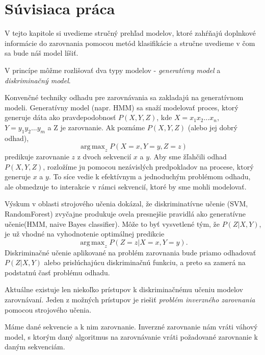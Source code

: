 \chapter{Súvisiaca práca}

V tejto kapitole si uvedieme stručný prehľad modelov, ktoré zahŕňajú doplnkové informácie do zarovnania pomocou metód klasifikácie a stručne uvedieme v čom sa bude náš model líšiť.

V princípe môžme rozlišovať dva typy modelov - \textit{generatívny model} a \textit{diskriminačný model}.

Konvenčné techniky odhadu pre zarovnávania sa zakladajú na generatívnom modeli. Generatívny model (napr. HMM) sa snaží modelovať proces, ktorý generuje dáta ako pravdepodobnosť $P(X,Y,Z)$, kde $X = x_1x_2\dots x_n$, $Y = y_1y_2\dots y_m$ a Z je zarovnanie. Ak poznáme $P(X,Y,Z)$ (alebo jej dobrý odhad),
$$\operatorname{arg\,max}_z P(X = x,Y = y,Z = z)$$
predikuje zarovnanie $z$ z dvoch sekvencií $x$ a $y$. Aby sme žľahčili odhad $P(X,Y,Z)$, rozložíme ju pomocou nezávislých predpokladov na procese, ktorý generuje $x$ a $y$. To síce vedie k efektívnym a jednoduchým problémom odhadu, ale obmedzuje to interakcie v rámci sekvencií, ktoré by sme mohli modelovať. \cite{svmTrainingProteinsAlignment}

Výskum v oblasti strojového učenia dokázal, že diskriminatívne učenie (SVM, RandomForest) zvyčajne produkuje ovela presnejšie pravidlá ako generatívne učenie(HMM, naive Bayes classifier).
Môže to byť vysvetlené tým, že $P(Z|X,Y)$, je už vhodné na vyhodnotenie optimálnej predikcie
$$\operatorname{arg\,max}_z P(Z = z|X = x,Y = y).$$
Diskriminačné učenie aplikované na problém zarovnania bude priamo odhadovať $P(Z|X,Y)$ alebo prislúchajúcu diskriminačnú funkciu, a preto sa zamerá na podstatnú časť problému odhadu. \cite{svmTrainingProteinsAlignment}

Aktuálne existuje len niekoľko prístupov k diskriminačnému učeniu modelov zarovnávaní. 
Jeden z možných prístupov je riešiť \textit{problém inverzného zarovnania} pomocou strojového učenia. \cite{svmTrainingProteinsAlignment}

\begin{df}
Máme dané sekvencie a k nim zarovnanie. Inverzné zarovnanie nám vráti váhový model, s ktorým daný algoritmus na zarovnávanie vráti požadované zarovnanie k daným sekvenciám.
\end{df}

